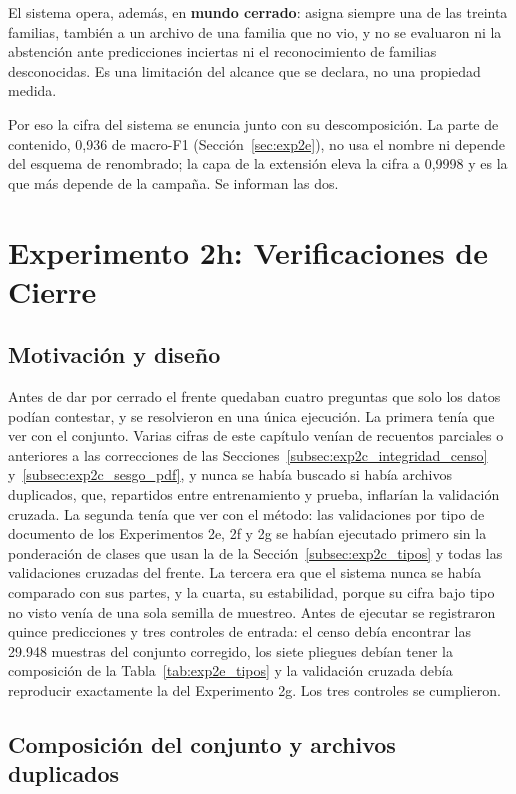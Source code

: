 El sistema opera, además, en \textbf{mundo cerrado}: asigna siempre una de las treinta familias, también a un archivo de una familia que no vio, y no se evaluaron ni la abstención ante predicciones inciertas ni el reconocimiento de familias desconocidas. Es una limitación del alcance que se declara, no una propiedad medida.

Por eso la cifra del sistema se enuncia junto con su descomposición. La parte de contenido, 0,936 de macro-F1 (Sección~\ref{sec:exp2e}), no usa el nombre ni depende del esquema de renombrado; la capa de la extensión eleva la cifra a 0,9998 y es la que más depende de la campaña. Se informan las dos.

\section{Experimento 2h: Verificaciones de Cierre}
\label{sec:exp2h}

\subsection{Motivación y diseño}

Antes de dar por cerrado el frente quedaban cuatro preguntas que solo los datos podían contestar, y se resolvieron en una única ejecución. La primera tenía que ver con el conjunto. Varias cifras de este capítulo venían de recuentos parciales o anteriores a las correcciones de las Secciones~\ref{subsec:exp2c_integridad_censo} y~\ref{subsec:exp2c_sesgo_pdf}, y nunca se había buscado si había archivos duplicados, que, repartidos entre entrenamiento y prueba, inflarían la validación cruzada. La segunda tenía que ver con el método: las validaciones por tipo de documento de los Experimentos 2e, 2f y 2g se habían ejecutado primero sin la ponderación de clases que usan la de la Sección~\ref{subsec:exp2c_tipos} y todas las validaciones cruzadas del frente. La tercera era que el sistema nunca se había comparado con sus partes, y la cuarta, su estabilidad, porque su cifra bajo tipo no visto venía de una sola semilla de muestreo. Antes de ejecutar se registraron quince predicciones y tres controles de entrada: el censo debía encontrar las 29.948 muestras del conjunto corregido, los siete pliegues debían tener la composición de la Tabla~\ref{tab:exp2e_tipos} y la validación cruzada debía reproducir exactamente la del Experimento 2g. Los tres controles se cumplieron.

\subsection{Composición del conjunto y archivos duplicados}

